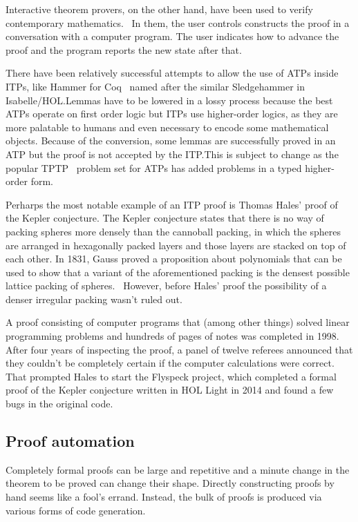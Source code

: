 \documentclass[english, 12pt, a4paper, sci, a-1b, online]{aaltothesis}
\begin{document}
Interactive theorem provers, on the other hand, have been used to verify contemporary mathematics.~\cite{itpsurvey} In them, the user controls constructs the proof in a conversation with a computer program. The user indicates how to advance the proof and the program reports the new state after that.

There have been relatively successful attempts to allow the use of ATPs inside ITPs, like Hammer for Coq~\cite{CoqHammer} named after the similar Sledgehammer in Isabelle/HOL.\@ Lemmas have to be lowered in a lossy process because the best ATPs operate on first order logic but ITPs use higher-order logics, as they are more palatable to humans and even necessary to encode some mathematical objects. Because of the conversion, some lemmas are successfully proved in an ATP but the proof is not accepted by the ITP.\@ This is subject to change as the popular TPTP~\cite{tptp} problem set for ATPs has added problems in a typed higher-order form.

Perharps the most notable example of an ITP proof is Thomas Hales' proof of the Kepler conjecture. The Kepler conjecture states that there is no way of packing spheres more densely than the cannoball packing, in which the spheres are arranged in hexagonally packed layers and those layers are stacked on top of each other. In 1831, Gauss proved a proposition about polynomials that can be used to show that a variant of the aforementioned packing is the densest possible lattice packing of spheres.~\cite{dichteste} However, before Hales' proof the possibility of a denser irregular packing wasn't ruled out.

A proof consisting of computer programs that (among other things) solved linear programming problems and hundreds of pages of notes was completed in 1998. After four years of inspecting the proof, a panel of twelve referees announced that they couldn't be completely certain if the computer calculations were correct. That prompted Hales to start the Flyspeck project, which completed a formal proof of the Kepler conjecture written in HOL Light in 2014 and found a few bugs in the original code.~\cite{itpsurvey}

\subsection{Proof automation}

Completely formal proofs can be large and repetitive and a minute change in the theorem to be proved can change their shape. Directly constructing proofs by hand seems like a fool's errand. Instead, the bulk of proofs is produced via various forms of code generation.
\end{document}
